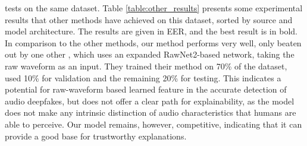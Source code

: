 \documentclass{article}
\begin{document}
			tests on the same dataset. Table \ref{table:other_results} presents some experimental
			results that other methods have achieved on this dataset, sorted by source and model
			architecture. The results are given in EER, and the best result is in bold. In
			comparison to the other methods, our method performs very well, only beaten out by one
			other \cite{ranjan_statnet_2022}, which uses an expanded RawNet2-based network, taking
			the raw waveform as an input. They trained their method on 70\% of the dataset, used
			10\% for validation and the remaining 20\% for testing. This indicates a potential for
			raw-waveform based learned feature in the accurate detection of audio deepfakes, but
			does not offer a clear path for explainability, as the model does not make any
			intrinsic distinction of audio characteristics that humans are able to perceive. Our
			model remains, however, competitive, indicating that it can provide a good base for
			trustworthy explanations.
\end{document}
